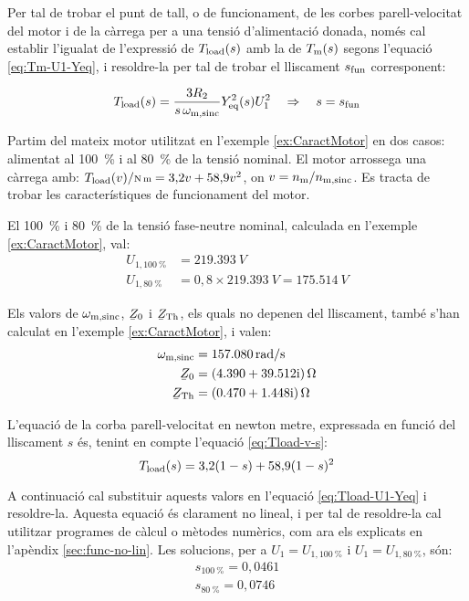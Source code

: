 Per tal de trobar el punt de tall, o de funcionament, de les corbes parell-velocitat del motor i de la càrrega per a una tensió d'alimentació donada, només cal establir l'igualat de l'expressió de $T_\mathrm{load}(s)$ amb la de $T_\mathrm{m}(s)$ segons l'equació \eqref{eq:Tm-U1-Yeq}, i resoldre-la per tal de trobar el lliscament $s_\mathrm{fun}$ corresponent:

\begin{equation}\label{eq:Tload-U1-Yeq}
	T_\mathrm{load}(s) = \frac{3 R_2}{s\,\omega_\mathrm{m,sinc}} Y_\mathrm{eq}^2(s) U_1^2 \quad\Rightarrow \quad s=s_\mathrm{fun}
\end{equation}


\begin{exemple}\label{ex:MotTensRedSolEx}
	\addcontentsxms{\MotTensRedSolEx}
	Partim del mateix motor utilitzat en l'exemple \vref{ex:CaractMotor} en dos casos: alimentat al \qty{100}{\%} i al \qty{80}{\%} de la tensió nominal. El motor arrossega una càrrega amb: $T\ped{load}(v) /{\scriptstyle \unit{N.m}} = 3{,}2 v + 58{,}9 v^2$, on $v = n_\mathrm{m}/n_\mathrm{m,sinc}$. Es tracta de trobar les característiques de funcionament del motor.
	
	El \qty{100}{\%} i \qty{80}{\%} de la tensió fase-neutre nominal, calculada  en l'exemple \ref{ex:CaractMotor}, val:
	\begin{align*}
		U_{1,\qty{100}{\%}} &= \qty{219,393}{V} \\
		U_{1,\qty{80}{\%}} &= 0{,}8\times\qty{219,393}{V} = \qty{175,514}{V}
	\end{align*}

	Els valors de $\omega_\mathrm{m,sinc}$, $\cmplx{Z}_0$ i  $\cmplx{Z}\ped{Th}$, els quals no depenen del lliscament, també s'han calculat en  l'exemple \ref{ex:CaractMotor}, i valen:
	\vspace{-2mm}
	\begin{align*}
		\omega\ped{m,sinc} &=  \qty{157,080}{rad/s} \\
		\cmplx{Z}_0 &=  \complexqty{4,390+j39,512}{\ohm} \\
		\cmplx{Z}\ped{Th} &= \complexqty{0,470+j1,448}{\ohm} 
	\end{align*}
	
	L'equació de la corba parell-velocitat en newton metre, expressada en funció del lliscament $s$ és, tenint en compte l'equació \eqref{eq:Tload-v-s}:
	\[
		T_\mathrm{load}(s) = 3{,}2 (1-s) + 58{,}9 (1-s)^2
	\]

	A continuació cal substituir aquests valors en l'equació \eqref{eq:Tload-U1-Yeq} i resoldre-la. Aquesta equació és clarament no lineal, i per tal de resoldre-la cal utilitzar programes de càlcul o mètodes numèrics, com ara els explicats en l'apèndix \ref{sec:func-no-lin}. Les solucions, per a $U_1=U_{1,\qty{100}{\%}}$ i $U_1=U_{1,\qty{80}{\%}}$, són:
	\begin{align*}
		s_{\qty{100}{\%}} = 0{,}0461 \\
	 	s_{\qty{80}{\%}}= 0{,}0746
	\end{align*}	
	

\end{exemple}
